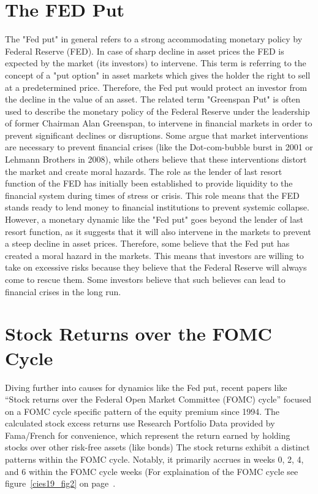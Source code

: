 \section{The FED Put}
The "Fed put" in general refers to a strong accommodating monetary policy by Federal Reserve (FED). In case of sharp decline in asset prices the FED is expected by the market (its investors) to intervene. \parencite{FED_Put_dynamic_explained }
This term is referring to the concept of a "put option" in asset markets which gives the holder the right to sell at a predetermined price.
Therefore, the Fed put would protect an investor from the decline in the value of an asset. 
The related term "Greenspan Put" is often used to describe the monetary policy of the Federal Reserve under the leadership of former Chairman Alan Greenspan, to intervene in financial markets in order to prevent significant declines or disruptions. 
Some argue that market interventions are necessary to prevent financial crises (like the Dot-com-bubble burst in 2001 or Lehmann Brothers in 2008), while others believe that these interventions distort the market and create moral hazards.  \parencite{cieslak_economics_2020}
The role as the lender of last resort function of the FED has initially been established to provide liquidity to the financial system during times of stress or crisis.  \parencite{ The role as the lender of last resort function }
This role means that the FED stands ready to lend money to financial institutions to prevent systemic collapse. 
However, a monetary dynamic like the "Fed put" goes beyond the lender of last resort function, as it suggests that it will also intervene in the markets to prevent a steep decline in asset prices.
Therefore, some believe that the Fed put has created a moral hazard in the markets.  \parencite{FED moral hazard} 
This means that investors are willing to take on excessive risks because they believe that the Federal Reserve will always come to rescue them. Some investors believe that such believes can lead to financial crises in the long run. 

\section{Stock Returns over the FOMC Cycle}

Diving further into causes for dynamics like the Fed put, recent papers like “Stock returns over the Federal Open Market Committee (FOMC) cycle” focused on a FOMC cycle specific pattern of the equity premium since 1994. 
The calculated stock excess returns use Research Portfolio Data provided by Fama/French\parencite{Fama/French Factors} for convenience, which represent the return earned by holding stocks over other risk-free assets (like bonds)
The stock returns exhibit a distinct patterns within the FOMC cycle. Notably, it primarily accrues in weeks 0, 2, 4, and 6 within the FOMC cycle weeks (For explaination of the FOMC cycle see figure~\ref{cies19_fig2} on page~\pageref{cies19_fig2}.

